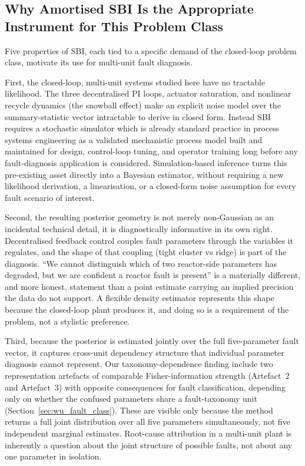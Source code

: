 \documentclass[aps,pre,twocolumn,superscriptaddress]{revtex4-2}
\begin{document}
\subsection{Why Amortised SBI Is the Appropriate Instrument for This Problem Class}
\label{sec:disc_why_sbi}

Five properties of SBI, each tied to a specific
demand of the closed-loop problem class, motivate its use for multi-unit fault diagnosis.

First, the closed-loop, multi-unit systems studied here have no tractable
likelihood. The three decentralised PI loops, actuator saturation, and
nonlinear recycle dynamics (the snowball effect) make an explicit noise
model over the summary-statistic vector intractable to derive in closed
form. Instead SBI requires a stochastic simulator which is already standard practice in process systems engineering as a validated mechanistic process model built and maintained for design,
control-loop tuning, and operator training long before any fault-diagnosis
application is considered. Simulation-based inference turns this
pre-existing asset directly into a Bayesian estimator, without requiring a
new likelihood derivation, a linearisation, or a closed-form noise
assumption for every fault scenario of interest.

Second, the resulting posterior geometry is not merely non-Gaussian as an
incidental technical detail, it is diagnostically informative in its own
right. Decentralised feedback control couples fault parameters through the
variables it regulates, and the shape of that coupling (tight cluster vs ridge) is part of the
diagnosis. ``We cannot distinguish which of two reactor-side parameters has
degraded, but we are confident a reactor fault is present'' is a
materially different, and more honest, statement than a point estimate
carrying an implied precision the data do not support. A flexible density
estimator represents this shape because the closed-loop plant produces it,
and doing so is a requirement of the problem, not a stylistic preference.

Third, because the posterior is estimated jointly over the full
five-parameter fault vector, it captures cross-unit dependency structure
that individual parameter diagnosis cannot represent.
Our taxonomy-dependence finding include two representation
artefacts of comparable Fisher-information strength (Artefact~2 and
Artefact~3) with opposite consequences for fault classification, depending
only on whether the confused parameters share a fault-taxonomy unit
(Section~\ref{sec:wu_fault_class}). These are visible only because the method
returns a full joint distribution over all five parameters simultaneously,
not five independent marginal estimates. Root-cause attribution in a
multi-unit plant is inherently a question about the joint structure of
possible faults, not about any one parameter in isolation.
\end{document}
